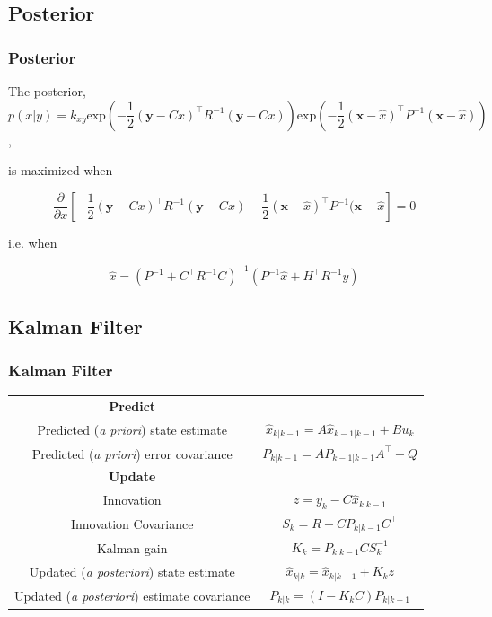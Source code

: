 \documentclass[10pt]{beamer}
\begin{document}

\subsection{Posterior}

\begin{frame}

  \frametitle{Posterior}

  The posterior, $$p(x|y) = k_{xy}\text{exp}\left( -\frac{1}{2}(\mathbf{y} - Cx)^\top R^{-1}(\mathbf{y} - Cx)\right)\text{exp}\left( -\frac{1}{2}(\mathbf{x} - \hat{x})^\top P^{-1}(\mathbf{x} - \hat{x})\right) $$,

  is maximized when

  $$ \frac{\partial}{\partial x} \left[ -\frac{1}{2}(\mathbf{y} - Cx)^\top R^{-1}(\mathbf{y} - Cx) -\frac{1}{2}(\mathbf{x} - \hat{x})^\top P^{-1}(\mathbf{x} - \hat{x}\right] = 0$$

  i.e. when 

  $$ \hat{x} = \left( P^{-1} + C^\top R^{-1} C \right)^{-1}\left( P^{-1}\hat{x} + H^\top R^{-1}y\right) $$



\end{frame}



\subsection{Kalman Filter}

\begin{frame}

  \frametitle{Kalman Filter}

  \begin{tabular}{cc}
  \textbf{Predict} & \\
  Predicted (\textit{a priori}) state estimate & $\hat{x}_{k|k-1} = A\hat{x}_{k-1|k-1} + Bu_k$  \\
  Predicted (\textit{a priori}) error covariance & $P_{k|k-1} = AP_{k-1|k-1}A^\top + Q$ \\

  \textbf{Update} & \\
  Innovation & $z = y_k - C\hat{x}_{k|k-1}$ \\
  Innovation Covariance & $S_k = R + CP_{k|k-1}C^\top$ \\
  Kalman gain & $K_k = P_{k|k-1}CS_k^{-1}$ \\
  Updated (\textit{a posteriori}) state estimate & $\hat{x}_{k|k} = \hat{x}_{k|k-1} + K_k z$ \\
  Updated (\textit{a posteriori}) estimate covariance & $P_{k|k} = (I - K_kC)P_{k|k-1}$ 
  \end{tabular}  

  



\end{frame}
\end{document}
